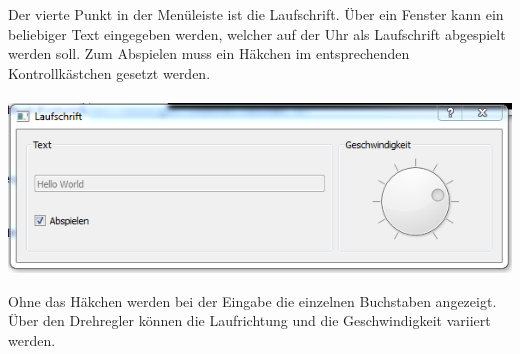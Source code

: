 \begin{multicols}{2}
Der vierte Punkt in der Menüleiste ist die Laufschrift. Über ein Fenster kann ein beliebiger Text eingegeben werden, welcher auf der Uhr als Laufschrift abgespielt werden soll. Zum Abspielen muss ein Häkchen im entsprechenden Kontrollkästchen gesetzt werden. \\
\\
{
    \centering
    \includegraphics[width=1\columnwidth]{Abbildungen/Software/Laufschrift02}
}

Ohne das Häkchen werden bei der Eingabe die einzelnen Buchstaben angezeigt. Über den Drehregler können die Laufrichtung und die Geschwindigkeit variiert werden.


\end{multicols}


